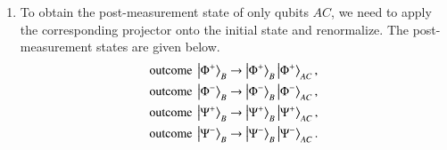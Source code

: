 \begin{solution}
\begin{enumerate}[label=(\alph*)]
    \item To obtain the post-measurement state of only qubits $AC$, we need to apply the corresponding projector onto the initial state and renormalize. The post-measurement states are given below.
    \begin{align*}
        \text{outcome } \left| \Phi^+ \right\rangle_B & \rightarrow \left| \Phi^+ \right\rangle_B \left| \Phi^+ \right\rangle_{AC}, \\
        \text{outcome } \left| \Phi^- \right\rangle_B & \rightarrow \left| \Phi^- \right\rangle_B \left| \Phi^- \right\rangle_{AC}, \\
        \text{outcome } \left| \Psi^+ \right\rangle_B & \rightarrow \left| \Psi^+ \right\rangle_B \left| \Psi^+ \right\rangle_{AC}, \\
        \text{outcome } \left| \Psi^- \right\rangle_B & \rightarrow \left| \Psi^- \right\rangle_B \left| \Psi^- \right\rangle_{AC}.
    \end{align*}
\end{enumerate}
\end{solution}

